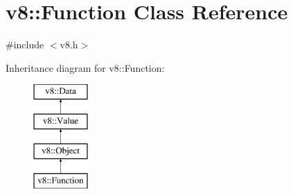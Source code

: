 \hypertarget{classv8_1_1_function}{}\section{v8\+:\+:Function Class Reference}
\label{classv8_1_1_function}


{\ttfamily \#include $<$v8.\+h$>$}

Inheritance diagram for v8\+:\+:Function\+:\begin{figure}[H]
\begin{center}
\leavevmode
\includegraphics[height=4.000000cm]{classv8_1_1_function}
\end{center}
\end{figure}
